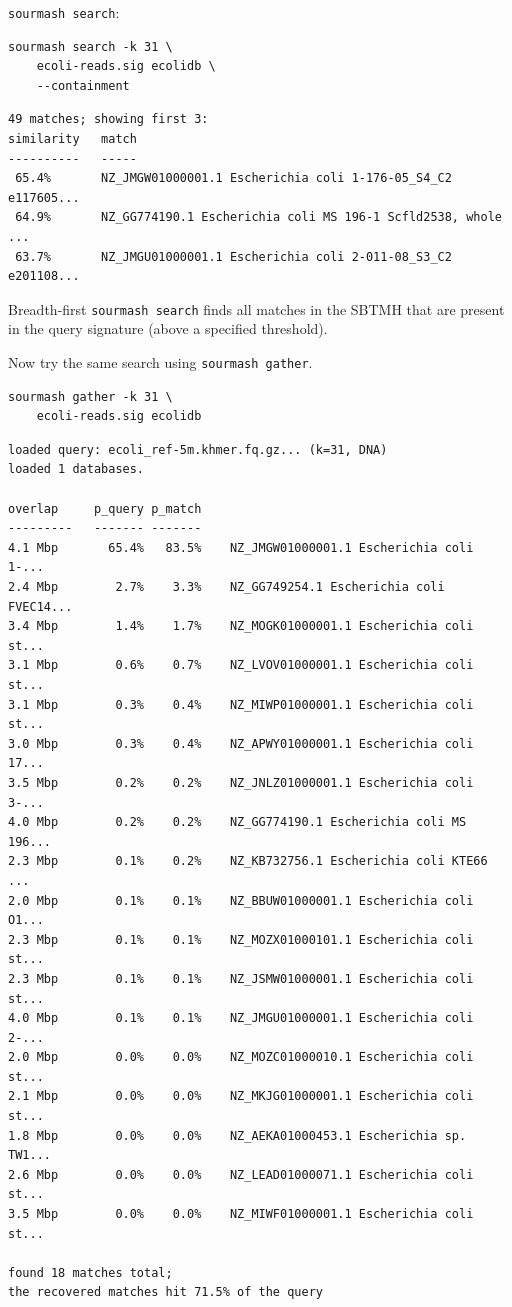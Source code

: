 \documentclass[10pt,a4paper,twocolumn]{article}
\begin{document}
\lstinline{sourmash search}: 

\begin{lstlisting}
sourmash search -k 31 \
    ecoli-reads.sig ecolidb \  
    --containment
\end{lstlisting}

\begin{lstlisting}[basicstyle=\tiny]
49 matches; showing first 3:
similarity   match
----------   -----
 65.4%       NZ_JMGW01000001.1 Escherichia coli 1-176-05_S4_C2 e117605...
 64.9%       NZ_GG774190.1 Escherichia coli MS 196-1 Scfld2538, whole ...
 63.7%       NZ_JMGU01000001.1 Escherichia coli 2-011-08_S3_C2 e201108...
\end{lstlisting}

Breadth-first \lstinline{sourmash search} finds all matches in the SBTMH that are present in the query signature (above a specified threshold).

Now try the same search using \lstinline{sourmash gather}.

\begin{lstlisting}
sourmash gather -k 31 \ 
    ecoli-reads.sig ecolidb
\end{lstlisting}

\begin{lstlisting}[basicstyle=\tiny,]
loaded query: ecoli_ref-5m.khmer.fq.gz... (k=31, DNA)
loaded 1 databases.

overlap     p_query p_match
---------   ------- -------
4.1 Mbp       65.4%   83.5%    NZ_JMGW01000001.1 Escherichia coli 1-...
2.4 Mbp        2.7%    3.3%    NZ_GG749254.1 Escherichia coli FVEC14...
3.4 Mbp        1.4%    1.7%    NZ_MOGK01000001.1 Escherichia coli st...
3.1 Mbp        0.6%    0.7%    NZ_LVOV01000001.1 Escherichia coli st...
3.1 Mbp        0.3%    0.4%    NZ_MIWP01000001.1 Escherichia coli st...
3.0 Mbp        0.3%    0.4%    NZ_APWY01000001.1 Escherichia coli 17...
3.5 Mbp        0.2%    0.2%    NZ_JNLZ01000001.1 Escherichia coli 3-...
4.0 Mbp        0.2%    0.2%    NZ_GG774190.1 Escherichia coli MS 196...
2.3 Mbp        0.1%    0.2%    NZ_KB732756.1 Escherichia coli KTE66 ...
2.0 Mbp        0.1%    0.1%    NZ_BBUW01000001.1 Escherichia coli O1...
2.3 Mbp        0.1%    0.1%    NZ_MOZX01000101.1 Escherichia coli st...
2.3 Mbp        0.1%    0.1%    NZ_JSMW01000001.1 Escherichia coli st...
4.0 Mbp        0.1%    0.1%    NZ_JMGU01000001.1 Escherichia coli 2-...
2.0 Mbp        0.0%    0.0%    NZ_MOZC01000010.1 Escherichia coli st...
2.1 Mbp        0.0%    0.0%    NZ_MKJG01000001.1 Escherichia coli st...
1.8 Mbp        0.0%    0.0%    NZ_AEKA01000453.1 Escherichia sp. TW1...
2.6 Mbp        0.0%    0.0%    NZ_LEAD01000071.1 Escherichia coli st...
3.5 Mbp        0.0%    0.0%    NZ_MIWF01000001.1 Escherichia coli st...

found 18 matches total;
the recovered matches hit 71.5% of the query
\end{lstlisting}
\end{document}
